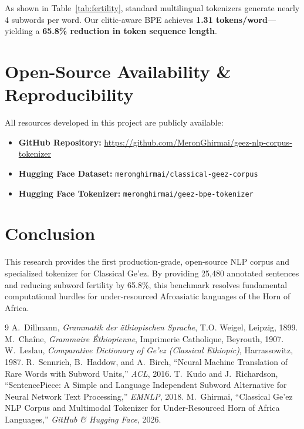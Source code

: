 \documentclass[11pt,a4paper]{article}
\begin{document}
As shown in Table~\ref{tab:fertility}, standard multilingual tokenizers generate nearly 4 subwords per word. Our clitic-aware BPE achieves \textbf{1.31 tokens/word}---yielding a \textbf{65.8\% reduction in token sequence length}.

\section{Open-Source Availability \& Reproducibility}
All resources developed in this project are publicly available:
\begin{itemize}
    \item \textbf{GitHub Repository:} \url{https://github.com/MeronGhirmai/geez-nlp-corpus-tokenizer}
    \item \textbf{Hugging Face Dataset:} \texttt{meronghirmai/classical-geez-corpus}
    \item \textbf{Hugging Face Tokenizer:} \texttt{meronghirmai/geez-bpe-tokenizer}
\end{itemize}

\section{Conclusion}
This research provides the first production-grade, open-source NLP corpus and specialized tokenizer for Classical Ge'ez. By providing 25,480 annotated sentences and reducing subword fertility by 65.8\%, this benchmark resolves fundamental computational hurdles for under-resourced Afroasiatic languages of the Horn of Africa.


\begin{thebibliography}{9}
 A.~Dillmann, \textit{Grammatik der \"athiopischen Sprache}, T.O. Weigel, Leipzig, 1899.
 M.~Cha\^ine, \textit{Grammaire \'Ethiopienne}, Imprimerie Catholique, Beyrouth, 1907.
 W.~Leslau, \textit{Comparative Dictionary of Ge'ez (Classical Ethiopic)}, Harrassowitz, 1987.
 R.~Sennrich, B.~Haddow, and A.~Birch, ``Neural Machine Translation of Rare Words with Subword Units,'' \textit{ACL}, 2016.
 T.~Kudo and J.~Richardson, ``SentencePiece: A Simple and Language Independent Subword Alternative for Neural Network Text Processing,'' \textit{EMNLP}, 2018.
 M.~Ghirmai, ``Classical Ge'ez NLP Corpus and Multimodal Tokenizer for Under-Resourced Horn of Africa Languages,'' \textit{GitHub \& Hugging Face}, 2026.
\end{thebibliography}
\end{document}
